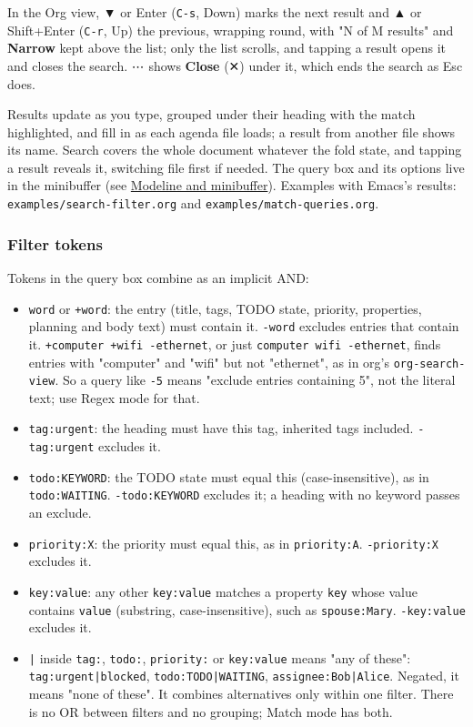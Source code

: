 \documentclass[11pt]{article}
\begin{document}
In the Org view, ▼ or Enter (\texttt{C-s}, Down) marks the next result and ▲ or Shift+Enter (\texttt{C-r}, Up) the previous, wrapping round, with "N of M results" and \textbf{Narrow} kept above the list; only the list scrolls, and tapping a result opens it and closes the search. ⋯ shows \textbf{Close} (✕) under it, which ends the search as Esc does.

Results update as you type, grouped under their heading with the match highlighted, and fill in as each agenda file loads; a result from another file shows its name. Search covers the whole document whatever the fold state, and tapping a result reveals it, switching file first if needed. The query box and its options live in the minibuffer (see \hyperref[sec:org87b300e]{Modeline and minibuffer}). Examples with Emacs's results: \texttt{examples/search-filter.org} and \texttt{examples/match-queries.org}.

\subsubsection{Filter tokens}
\label{sec:org0815cf8}

Tokens in the query box combine as an implicit AND:

\begin{itemize}
\item \texttt{word} or \texttt{+word}: the entry (title, tags, TODO state, priority, properties, planning and body text) must contain it. \texttt{-word} excludes entries that contain it. \texttt{+computer +wifi -ethernet}, or just \texttt{computer wifi -ethernet}, finds entries with "computer" and "wifi" but not "ethernet", as in org's \texttt{org-search-view}. So a query like \texttt{-5} means "exclude entries containing 5", not the literal text; use Regex mode for that.
\item \texttt{tag:urgent}: the heading must have this tag, inherited tags included. \texttt{-tag:urgent} excludes it.
\item \texttt{todo:KEYWORD}: the TODO state must equal this (case-insensitive), as in \texttt{todo:WAITING}. \texttt{-todo:KEYWORD} excludes it; a heading with no keyword passes an exclude.
\item \texttt{priority:X}: the priority must equal this, as in \texttt{priority:A}. \texttt{-priority:X} excludes it.
\item \texttt{key:value}: any other \texttt{key:value} matches a property \texttt{key} whose value contains \texttt{value} (substring, case-insensitive), such as \texttt{spouse:Mary}. \texttt{-key:value} excludes it.
\item \texttt{|} inside \texttt{tag:}, \texttt{todo:}, \texttt{priority:} or \texttt{key:value} means "any of these": \texttt{tag:urgent|blocked}, \texttt{todo:TODO|WAITING}, \texttt{assignee:Bob|Alice}. Negated, it means "none of these". It combines alternatives only within one filter. There is no OR between filters and no grouping; Match mode has both.
\end{itemize}
\end{document}
